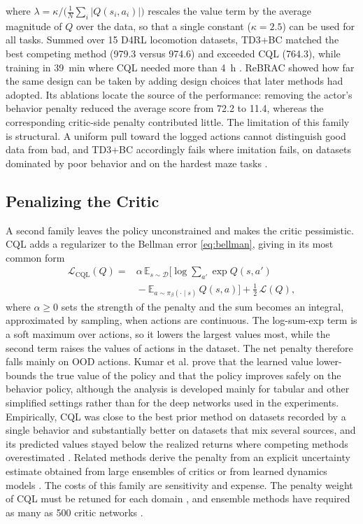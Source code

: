 \documentclass[conference]{IEEEtran}
\begin{document}
where $\lambda = \kappa \big/ \big(\tfrac{1}{N}\sum_{i} |Q(s_i,a_i)|\big)$ rescales the value term by the average magnitude of $Q$ over the data, so that a single constant ($\kappa = 2.5$) can be used for all tasks. Summed over 15 D4RL locomotion datasets, TD3+BC matched the best competing method (979.3 versus 974.6) and exceeded CQL (764.3), while training in 39~min where CQL needed more than 4~h \cite{fujimoto2021td3bc}. ReBRAC \cite{tarasov2023rebrac} showed how far the same design can be taken by adding design choices that later methods had adopted. Its ablations locate the source of the performance: removing the actor's behavior penalty reduced the average score from 72.2 to 11.4, whereas the corresponding critic-side penalty contributed little. The limitation of this family is structural. A uniform pull toward the logged actions cannot distinguish good data from bad, and TD3+BC accordingly fails where imitation fails, on datasets dominated by poor behavior and on the hardest maze tasks \cite{fujimoto2021td3bc}.

\subsection{Penalizing the Critic}
A second family leaves the policy unconstrained and makes the critic pessimistic. CQL \cite{kumar2020cql} adds a regularizer to the Bellman error \eqref{eq:bellman}, giving in its most common form
\begin{align}
\mathcal{L}_{\mathrm{CQL}}(Q) ={}& \alpha\, \mathbb{E}_{s \sim \mathcal{D}}\Big[\log \sum_{a'} \exp Q(s,a') \nonumber\\
& {}- \mathbb{E}_{a \sim \pi_\beta(\cdot \mid s)}\, Q(s,a)\Big] + \tfrac{1}{2}\,\mathcal{L}(Q),
\label{eq:cql}
\end{align}
where $\alpha \geq 0$ sets the strength of the penalty and the sum becomes an integral, approximated by sampling, when actions are continuous. The log-sum-exp term is a soft maximum over actions, so it lowers the largest values most, while the second term raises the values of actions in the dataset. The net penalty therefore falls mainly on OOD actions. Kumar et al. prove that the learned value lower-bounds the true value of the policy and that the policy improves safely on the behavior policy, although the analysis is developed mainly for tabular and other simplified settings rather than for the deep networks used in the experiments. Empirically, CQL was close to the best prior method on datasets recorded by a single behavior and substantially better on datasets that mix several sources, and its predicted values stayed below the realized returns where competing methods overestimated \cite{kumar2020cql}. Related methods derive the penalty from an explicit uncertainty estimate obtained from large ensembles of critics \cite{an2021edac} or from learned dynamics models \cite{yu2020mopo}. The costs of this family are sensitivity and expense. The penalty weight of CQL must be retuned for each domain \cite{kumar2020cql}, and ensemble methods have required as many as 500 critic networks \cite{an2021edac,tarasov2023rebrac}.
\end{document}
